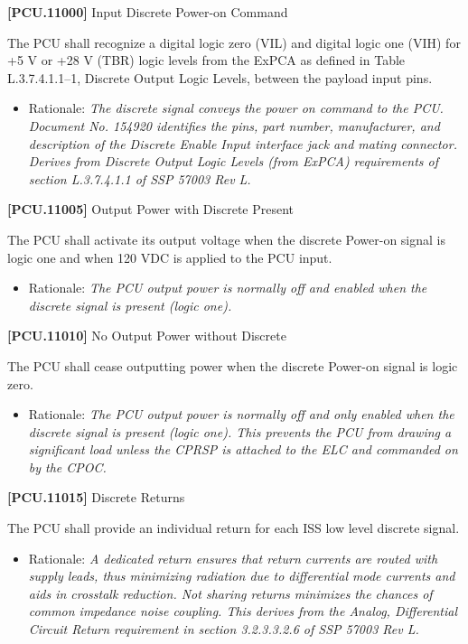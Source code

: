 \documentclass[12pt,oneside,oldfontcommands]{memoir}
\begin{document}
\textbf{[PCU.11000]} Input Discrete Power-on Command

The \gls{PCU} shall recognize a digital logic zero (VIL) and digital logic one (VIH) for +5 V or +28 V (TBR\label{tbx_5}) logic levels from the ExPCA as defined in Table L.3.7.4.1.1--1, Discrete Output Logic Levels, between the payload input pins.

\begin{itemize}
\item{} Rationale: \emph{The discrete signal conveys the power on command to the PCU. Document No. 154920 identifies the pins, part number, manufacturer, and description of the Discrete Enable Input interface jack and mating connector. Derives from Discrete Output Logic Levels (from ExPCA) requirements of section L.3.7.4.1.1 of SSP 57003 Rev L.}

\end{itemize}

\textbf{[PCU.11005]} Output Power with Discrete Present

The \gls{PCU} shall activate its output voltage when the discrete Power-on signal is logic one and when 120 \gls{VDC} is applied to the \gls{PCU} input.

\begin{itemize}
\item{} Rationale: \emph{The PCU output power is normally off and enabled when the discrete signal is present (logic one).}

\end{itemize}

\textbf{[PCU.11010]} No Output Power without Discrete

The \gls{PCU} shall cease outputting power when the discrete Power-on signal is logic zero.

\begin{itemize}
\item{} Rationale: \emph{The PCU output power is normally off and only enabled when the discrete signal is present (logic one). This prevents the PCU from drawing a significant load unless the CPRSP is attached to the ELC and commanded on by the CPOC.}

\end{itemize}

\textbf{[PCU.11015]} Discrete Returns

The \gls{PCU} shall provide an individual return for each \gls{ISS} low level discrete signal.

\begin{itemize}
\item{} Rationale: \emph{A dedicated return ensures that return currents are routed with supply leads, thus minimizing radiation due to differential mode currents and aids in crosstalk reduction. Not sharing returns minimizes the chances of common impedance noise coupling. This derives from the Analog, Differential Circuit Return requirement in section 3.2.3.3.2.6 of SSP 57003 Rev L.}

\end{itemize}
\end{document}
